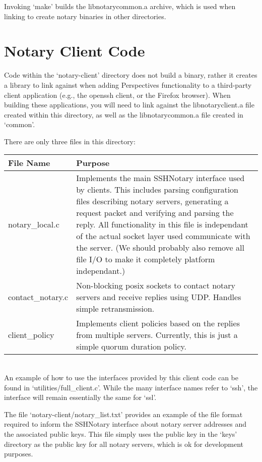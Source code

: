 \documentclass[pdftex,singlecolumn,11pt,letterpaper]{article}
\newcommand{\name}{Perspectives\xspace}
\begin{document}
Invoking `make' builds the libnotarycommon.a archive, which is used when 
linking to create notary binaries in other directories.  

\section{Notary Client Code}

Code within the `notary-client' directory does not build a binary, rather
it creates a library to link against when adding \name functionality to 
a third-party client application (e.g., the openssh client, or the Firefox
browser).  When building these applications, you will need to link against
the libnotaryclient.a file created within this directory, as well as the 
libnotarycommon.a file created in `common'.  

There are only three files in this directory:\\

\begin{tabular*}{1.1\textwidth}{ @{\extracolsep{\fill}} | p{3cm} | p{10cm} | }
\hline 
\textbf{File Name}  & \textbf{Purpose} \\
\hline 
notary\_local.c & Implements the main SSHNotary interface used by clients.
This includes parsing configuration files describing notary servers, 
generating a request packet and verifying and parsing the reply.  All
functionality in this file is independant of the actual socket layer 
used communicate with the server. (We should probably also remove all 
file I/O to make it completely platform independant.) \\

contact\_notary.c &  Non-blocking posix sockets to contact notary servers and
receive replies using UDP.  Handles simple retransmission. \\

client\_policy & Implements client policies based on the replies from multiple
servers.  Currently, this is just a simple quorum duration policy.  \\
   
\hline
\end{tabular*} \\

An example of how to use the interfaces provided by this client code can be
found in `utilities/full\_client.c'.  While the many interface names refer to
`ssh', the interface will remain essentially the same for `ssl'.  

The file `notary-client/notary\_list.txt' 
provides an example of the file format required
to inform the SSHNotary interface about notary server addresses and the
associated public keys.  This file simply uses the public key in the `keys'
directory as the public key for all notary servers, which is ok for 
development purposes.  
\end{document}
